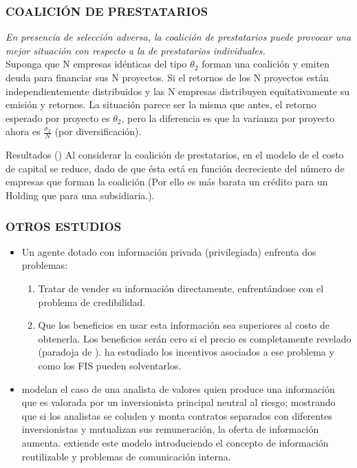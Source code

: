 \begin{frame}
    \frametitle{{\normalsize COALICIÓN DE PRESTATARIOS} {}}
    
    \textit{En presencia de selección adversa, la coalición de prestatarios puede provocar una mejor situación con respecto a la de prestatarios individuales.}\\
    
    Suponga que N empresas idénticas del tipo $\theta_{2}$ forman una coalición  y emiten deuda para financiar sus N proyectos. Si el retornos de los N proyectos están independientemente distribuidos y las N empresas distribuyen equitativamente su emisión y retornos. La situación parece ser la misma que antes, el retorno esperado por proyecto es $\theta_{2}$, pero la diferencia es que la varianza por proyecto ahora es $\frac{\sigma_{2}}{N}$ (por diversificación).\\
    
    \begin{block} {Resultados (\cite{Diamond1984})}
     Al considerar la coalición de prestatarios, en el modelo de \cite{Leland77} el costo de capital se reduce, dado de que ésta está en función decreciente del número de empresas que forman la coalición (Por ello es más barata un crédito para un Holding que para una subsidiaria.).     
    \end{block}	
    
    
\end{frame}


\begin{frame}
    \frametitle{{\normalsize OTROS ESTUDIOS} {}}
     \begin{itemize}
         \item  Un agente dotado con información privada (privilegiada) enfrenta dos problemas: 
         \begin{enumerate}
             \item Tratar de vender su información directamente, enfrentándose con el problema de credibilidad.
             \item Que los beneficios en usar esta información sea superiores al costo de obtenerla. Los beneficios serán cero si el precio es completamente revelado (paradoja de \cite{Grossman1980}). \cite{Campbell1980} ha estudiado los incentivos asociados a ese problema y como los FIS pueden solventarlos.
         \end{enumerate}
     \item \cite{Remark1984} modelan el caso de una analista de valores quien produce una información que es valorada por un inversionista principal neutral al riesgo; mostrando que si los analistas se coluden y monta contratos separados con diferentes inversionistas y mutualizan sus remuneración, la oferta de información aumenta. \cite{Millon1985} extiende este modelo introduciendo el concepto de información reutilizable y problemas de comunicación interna.  
     \end{itemize}
   
\end{frame}

